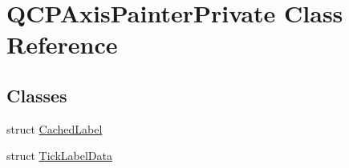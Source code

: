 \hypertarget{class_q_c_p_axis_painter_private}{}\section{Q\+C\+P\+Axis\+Painter\+Private Class Reference}
\label{class_q_c_p_axis_painter_private}
\subsection*{Classes}
\begin{DoxyCompactItemize}
\item 
struct \hyperlink{struct_q_c_p_axis_painter_private_1_1_cached_label}{Cached\+Label}
\item 
struct \hyperlink{struct_q_c_p_axis_painter_private_1_1_tick_label_data}{Tick\+Label\+Data}
\end{DoxyCompactItemize}
